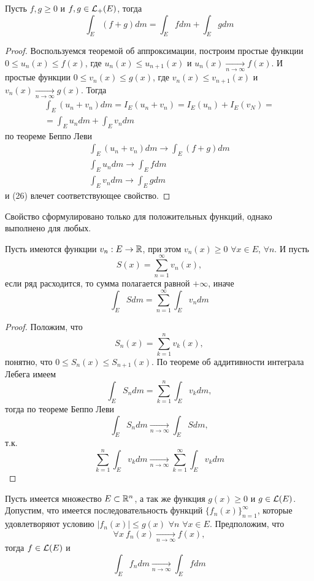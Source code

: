 \documentclass[main]{subfiles}
\begin{document}
\begin{corollary}
    Пусть $f, g \ge 0$ и $f,g \in \mathcal{L}_+(E)$, тогда
    \[\int_E (f+g) dm = \int_E fdm + \int_E gdm\]
\end{corollary}
\begin{proof}
    Воспользуемся теоремой об аппроксимации, построим простые функции $0 \le u_n(x) \le f(x)$, где $u_n(x) \le u_{n+1}(x)$ и $u_n(x) \xrightarrow[n \to \infty]{} f(x)$.
    И простые функции $0 \le v_n(x) \le g(x)$, где $v_n(x) \le v_{n+1}(x)$ и $v_n(x) \xrightarrow[n \to \infty]{} g(x)$.
    Тогда
    \begin{multline*}
        \int_E (u_n + v_n) dm = I_E(u_n + v_n) = I_E(u_n) + I_E(v_N) =\\
        = \int_E u_n dm + \int_E v_n dm \tag{26}
    \end{multline*}
    по теореме Беппо Леви
    \begin{gather*}
        \int_E (u_n + v_n) dm \to \int_E (f + g) dm \\
        \int_E u_n dm \to \int_E f dm \\
        \int_E v_n dm \to \int_E g dm
    \end{gather*}
    и (26) влечет соответствующее свойство.
\end{proof}
\begin{remark}
    Свойство сформулировано только для положительных функций, однако выполнено для любых.
\end{remark}

\begin{theorem}
    Пусть имеются функции $v_n: E \to \mathbb{R}$, при этом $v_n(x) \ge 0$ $\forall x \in E$, $\forall n$.
    И пусть
    \[S(x) = \sum_{n=1}^{\infty} v_n(x),\]
    если ряд расходится, то сумма полагается равной $+\infty$, иначе
    \[\int_E S dm  = \sum_{n=1}^{\infty} \int_E v_n dm\]
\end{theorem}
\begin{proof}
    Положим, что
    \[S_n(x) = \sum_{k=1}^{n} v_k(x),\]
    понятно, что $0 \le S_n(x) \le S_{n+1}(x)$.
    По теореме об аддитивности интеграла Лебега имеем
    \[\int_E S_n dm = \sum_{k=1}^{n} \int_E v_k dm,\]
    тогда по теореме Беппо Леви
    \[\int_E S_n dm \xrightarrow[n \to \infty]{} \int_E S dm, \]
    т.к.
    \[\sum_{k=1}^{n} \int_E v_k dm \xrightarrow[n \to \infty]{} \sum_{k=1}^{\infty} \int_E v_k dm\]
\end{proof}

\begin{theorem}
    Пусть имеется множество $E \subset \mathbb{R}^n$, а так же функция $g(x) \ge 0$ и $g \in \mathcal{L}(E)$.
    Допустим, что имеется последовательность функций $\{f_n(x)\}_{n=1}^\infty$, которые удовлетворяют условию $|f_n(x)| \le g(x)$ $\forall n$ $\forall x \in E$.
    Предположим, что
    \[\forall x\ f_n(x) \xrightarrow[n \to \infty]{} f(x),\]
    тогда $f \in \mathcal{L}(E)$ и
    \[\int_E f_n dm \xrightarrow[n \to \infty]{} \int_E f dm\]
\end{theorem}
\end{document}
